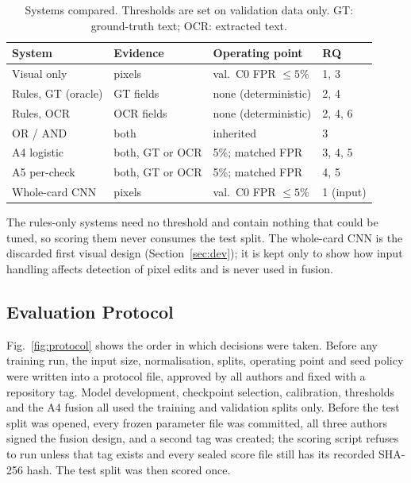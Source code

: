 \documentclass[conference]{IEEEtran}
\begin{document}
\begin{table}[!t]
\caption{Systems compared. Thresholds are set on validation data only.
GT: ground-truth text; OCR: extracted text.}
\label{tab:systems}
\centering
\scriptsize
\setlength{\tabcolsep}{2.8pt}
\renewcommand{\arraystretch}{1.12}
\begin{tabular}{@{}p{2.25cm}p{1.75cm}p{2.45cm}l@{}}
\toprule
System & Evidence & Operating point & RQ \\
\midrule
Visual only        & pixels            & val.\ C0 FPR $\le5\%$ & 1, 3 \\
Rules, GT (oracle) & GT fields         & none (deterministic)  & 2, 4 \\
Rules, OCR         & OCR fields        & none (deterministic)  & 2, 4, 6 \\
OR / AND           & both              & inherited             & 3 \\
A4 logistic        & both, GT or OCR   & 5\%; matched FPR      & 3, 4, 5 \\
A5 per-check       & both, GT or OCR   & 5\%; matched FPR      & 4, 5 \\
Whole-card CNN     & pixels            & val.\ C0 FPR $\le5\%$ & 1 (input) \\
\bottomrule
\end{tabular}
\end{table}

The rules-only systems need no threshold and contain nothing that could
be tuned, so scoring them never consumes the test split. The whole-card
CNN is the discarded first visual design (Section~\ref{sec:dev}); it is
kept only to show how input handling affects detection of pixel edits
and is never used in fusion.

\subsection{Evaluation Protocol}
\label{sec:protocol}

Fig.~\ref{fig:protocol} shows the order in which decisions were taken.
Before any training run, the input size, normalisation, splits, operating
point and seed policy were written into a protocol file, approved by
all authors and fixed with a repository tag. Model development,
checkpoint selection, calibration, thresholds and the A4 fusion all used
the training and validation splits only. Before the test split was
opened, every frozen parameter file was committed, all three authors
signed the fusion design, and a second tag was created; the scoring
script refuses to run unless that tag exists and every sealed score file
still has its recorded SHA-256 hash. The test split was then scored once.
\end{document}
